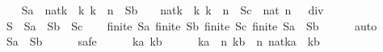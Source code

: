 \begin{isabellebody}
%
\isadelimproof
%
\endisadelimproof
%
\isatagproof
{}\isamarkupfalse%
{\isacharminus}\isanewline
\ \ \isamarkupfalse%
\ {\isacharquery}Sa\ {\isacharequal}\ {\isachardoublequoteopen}{\isacharbraceleft}{\isacharparenleft}{}{\isacharcolon}{\isacharcolon}nat{\isacharparenright}{\isacharcircum}k\ {\isacharbar}\ k{\isachardot}\ k\ {\isasymin}\ {\isacharbraceleft}{}{\isachardot}{\isachardot}{\isacharless}n{\isacharbraceright}{\isacharbraceright}{\isachardoublequoteclose}\ \ {\isacharquery}Sb\ {\isacharequal}\ {\isachardoublequoteopen}{\isacharbraceleft}{}\ {\isacharasterisk}\ {\isacharparenleft}{}{\isacharcolon}{\isacharcolon}nat{\isacharparenright}{\isacharcircum}k\ {\isacharbar}\ k{\isachardot}\ k\ {\isasymin}\ {\isacharbraceleft}{}{\isachardot}{\isachardot}{\isacharless}n{\isacharbraceright}{\isacharbraceright}{\isachardoublequoteclose}\ \ {\isacharquery}Sc\ {\isacharequal}\ {\isachardoublequoteopen}{\isacharbraceleft}{}{\isacharcolon}{\isacharcolon}nat{\isacharcomma}\ {\isacharparenleft}{}{\isacharcircum}n\ {\isacharplus}\ {}{\isacharparenright}\ div\ {}\ {\isacharminus}\ {}{\isacharbraceright}{\isachardoublequoteclose}\isanewline
\ \ \isamarkupfalse%
\ {\isacharquery}S\ {\isacharequal}\ {\isachardoublequoteopen}{\isacharquery}Sa\ {\isasymunion}\ {\isacharquery}Sb\ {\isasymunion}\ {\isacharquery}Sc{\isachardoublequoteclose}\isanewline
\isanewline
\ \ \isamarkupfalse%
\ {\isachardoublequoteopen}finite\ {\isacharquery}Sa{\isachardoublequoteclose}\ {\isachardoublequoteopen}finite\ {\isacharquery}Sb{\isachardoublequoteclose}\ {\isachardoublequoteopen}finite\ {\isacharquery}Sc{\isachardoublequoteclose}\ {\isachardoublequoteopen}finite\ {\isacharparenleft}{\isacharquery}Sa\ {\isasymunion}\ {\isacharquery}Sb{\isacharparenright}{\isachardoublequoteclose}\isanewline
\ \ \ \ \isamarkupfalse%
\ auto\isanewline
\isanewline
\ \ \isamarkupfalse%
\ {\isachardoublequoteopen}{\isacharquery}Sa\ {\isasyminter}\ {\isacharquery}Sb\ {\isacharequal}\ {\isacharbraceleft}{\isacharbraceright}{\isachardoublequoteclose}\isanewline
\ \ \isamarkupfalse%
\ safe\isanewline
\ \ \ \ \isamarkupfalse%
\ ka\ kb\isanewline
\ \ \ \ \isamarkupfalse%
\ {\isachardoublequoteopen}ka\ {\isasymin}\ {\isacharbraceleft}{}{\isachardot}{\isachardot}{\isacharless}n{\isacharbraceright}{\isachardoublequoteclose}\ {\isachardoublequoteopen}kb\ {\isasymin}\ {\isacharbraceleft}{}{\isachardot}{\isachardot}{\isacharless}n{\isacharbraceright}{\isachardoublequoteclose}\ {\isachardoublequoteopen}{\isacharparenleft}{}{\isacharcolon}{\isacharcolon}nat{\isacharparenright}{\isacharcircum}ka\ {\isacharequal}\ {}{\isacharasterisk}{}{\isacharcircum}kb{\isachardoublequoteclose}\isanewline

\end{isabellebody}
